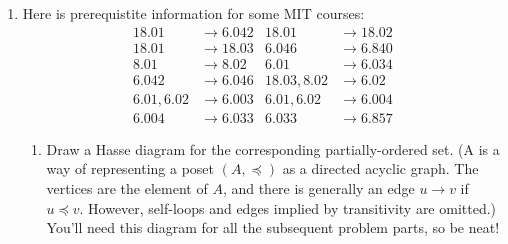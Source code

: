 \documentclass[12pt]{article}
\begin{document}
\begin{enumerate}
%
%
%
\item
Here is prerequistite information for some MIT courses:
%
\begin{align*}
18.01 & \to 6.042 & 18.01 & \to 18.02 \\
18.01 & \to 18.03 & 6.046 & \to 6.840 \\
8.01 & \to 8.02 & 6.01 & \to 6.034 \\
6.042 & \to 6.046 & 18.03, 8.02 & \to 6.02 \\
6.01, 6.02 & \to 6.003 & 6.01, 6.02 & \to 6.004 \\
6.004 & \to 6.033 & 6.033 & \to 6.857
\end{align*}

\begin{enumerate}

\item Draw a Hasse diagram for the corresponding partially-ordered
set.  (A  is a way of representing a poset $(A,
\preceq)$ as a directed acyclic graph.  The vertices are the element
of $A$, and there is generally an edge $u \to v$ if $u \preceq v$.
However, self-loops and edges implied by transitivity are omitted.)
You'll need this diagram for all the subsequent problem parts, so be
neat!


\end{enumerate}
\end{enumerate}
\end{document}
